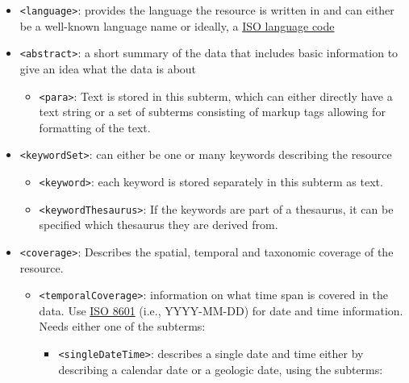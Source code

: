 \documentclass[
  oneside]{book}
\providecommand{\tightlist}{%
  \setlength{\itemsep}{0pt}\setlength{\parskip}{0pt}}
\begin{document}
\begin{itemize}
\item
  {\texttt{\textless{}language\textgreater{}}}: provides the language the resource is written in and can either be a well-known language name or ideally, a \href{https://www.w3schools.com/tags/ref_language_codes.asp}{ISO language code}
\item
  {\texttt{\textless{}abstract\textgreater{}}}: a short summary of the data that includes basic information to give an idea what the data is about

  \begin{itemize}
  \tightlist
  \item
    \texttt{\textless{}para\textgreater{}}: Text is stored in this subterm, which can either directly have a text string or a set of subterms consisting of markup tags allowing for formatting of the text.
  \end{itemize}
\item
  {\texttt{\textless{}keywordSet\textgreater{}}}: can either be one or many keywords describing the resource

  \begin{itemize}
  \tightlist
  \item
    \texttt{\textless{}keyword\textgreater{}}: each keyword is stored separately in this subterm as text.
  \item
    \texttt{\textless{}keywordThesaurus\textgreater{}}: If the keywords are part of a thesaurus, it can be specified which thesaurus they are derived from.
  \end{itemize}
\item
  {\texttt{\textless{}coverage\textgreater{}}}: Describes the spatial, temporal and taxonomic coverage of the resource.

  \begin{itemize}
  \tightlist
  \item
    {\texttt{\textless{}temporalCoverage\textgreater{}}}: information on what time span is covered in the data. Use \href{https://www.iso.org/iso-8601-date-and-time-format.html}{ISO 8601} (i.e., YYYY-MM-DD) for date and time information. Needs either one of the subterms:

    \begin{itemize}
    \tightlist
    \item
      \texttt{\textless{}singleDateTime\textgreater{}}: describes a single date and time either by describing a calendar date or a geologic date, using the subterms:


\end{itemize}
\end{itemize}
\end{itemize}
\end{document}
